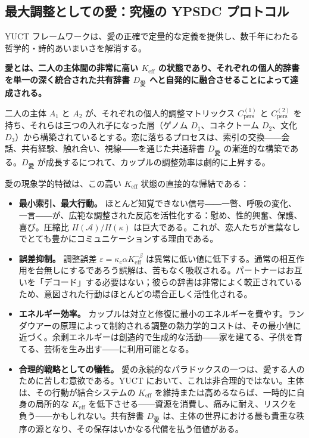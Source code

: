 \documentclass[12pt,a4paper]{article}
\begin{document}
	\subsection{最大調整としての愛：究極の YPSDC プロトコル}
	
	YUCT フレームワークは、愛の正確で定量的な定義を提供し、数千年にわたる哲学的・詩的あいまいさを解消する。
	
	\textbf{愛とは、二人の主体間の非常に高い \(K_{\mathrm{eff}}\) の状態であり、それぞれの個人的辞書を単一の深く統合された共有辞書 \(D_{\text{愛}}\) へと自発的に融合させることによって達成される。}
	
	二人の主体 \(A_1\) と \(A_2\) が、それぞれの個人的調整マトリックス \(C_{\text{pers}}^{(1)}\) と \(C_{\text{pers}}^{(2)}\) を持ち、それらは三つの入れ子になった層（ゲノム \(D_1\)、コネクトーム \(D_2\)、文化 \(D_3\)）から構築されているとする。恋に落ちるプロセスは、索引の交換――会話、共有経験、触れ合い、視線――を通じた共通辞書 \(D_{\text{愛}}\) の漸進的な構築である。\(D_{\text{愛}}\) が成長するにつれて、カップルの調整効率は劇的に上昇する。
	
	愛の現象学的特徴は、この高い \(K_{\mathrm{eff}}\) 状態の直接的な帰結である：
	
	\begin{itemize}[leftmargin=*]
		\item \textbf{最小索引、最大行動。} ほとんど知覚できない信号――一瞥、呼吸の変化、一言――が、広範な調整された反応を活性化する：慰め、性的興奮、保護、喜び。圧縮比 \(H(\mathcal{A}) / H(\kappa)\) は巨大である。これが、恋人たちが言葉なしでとても豊かにコミュニケーションする理由である。
		\item \textbf{誤差抑制。} 調整誤差 \(\varepsilon = \kappa_c \alpha K_{\mathrm{eff}}^{-\beta}\) は異常に低い値に低下する。通常の相互作用を台無しにするであろう誤解は、苦もなく吸収される。パートナーはお互いを「デコード」する必要はない；彼らの辞書は非常によく較正されているため、意図された行動はほとんどの場合正しく活性化される。
		\item \textbf{エネルギー効率。} カップルは対立と修復に最小のエネルギーを費やす。ランダウアーの原理によって制約される調整の熱力学的コストは、その最小値に近づく。余剰エネルギーは創造的で生成的な活動――家を建てる、子供を育てる、芸術を生み出す――に利用可能となる。
		\item \textbf{合理的戦略としての犠牲。} 愛の永続的なパラドックスの一つは、愛する人のために苦しむ意欲である。YUCT において、これは非合理的ではない。主体は、その行動が結合システムの \(K_{\mathrm{eff}}\) を維持または高めるならば、一時的に自身の局所的な \(K_{\mathrm{eff}}\) を低下させる――資源を消費し、痛みに耐え、リスクを負う――かもしれない。共有辞書 \(D_{\text{愛}}\) は、主体の世界における最も貴重な秩序の源となり、その保存はいかなる代償を払う価値がある。
	\end{itemize}
	
\end{document}
